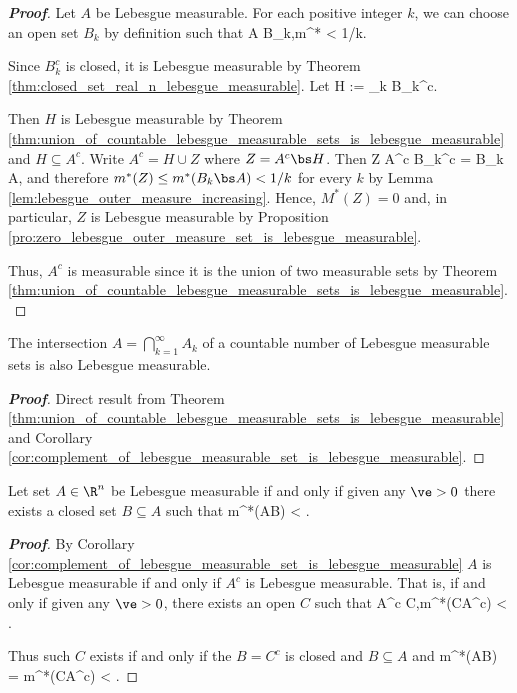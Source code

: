 \begin{proof}[\bf Proof]
Let $A$ be Lebesgue measurable. For each positive integer $k$, we can choose an open set $B_k$ by definition such that 
\be
A \subseteq B_k,\qquad m^* < 1/k.
\ee

Since $B_k^c$ is closed, it is Lebesgue measurable by Theorem \ref{thm:closed_set_real_n_lebesgue_measurable}. Let 
\be
H := \bigcup_k B_k^c.
\ee

Then $H$ is Lebesgue measurable by Theorem \ref{thm:union_of_countable_lebesgue_measurable_sets_is_lebesgue_measurable} and $H \subseteq A^c$. Write $A^c = H \cup Z$ where $Z = A^c\bs H$. Then 
\be
Z \subseteq A^c \bs B_k^c = B_k \bs A, 
\ee
and therefore $m^*(Z) \leq m^*(B_k\bs A) <  1/k$ for every $k$ by Lemma \ref{lem:lebesgue_outer_measure_increasing}. Hence, $M^*(Z) = 0$ and, in particular, $Z$ is Lebesgue measurable by Proposition \ref{pro:zero_lebesgue_outer_measure_set_is_lebesgue_measurable}.

Thus, $A^c$ is measurable since it is the union of two measurable sets by Theorem \ref{thm:union_of_countable_lebesgue_measurable_sets_is_lebesgue_measurable}.
\end{proof}



\begin{corollary}\label{cor:countable_intersection_lebesgue_measurable_sets_is_lebesgue_measurable}
The intersection $A = \bigcap_{k=1}^\infty A_k$ of a countable number of Lebesgue measurable sets is also Lebesgue measurable.
\end{corollary}

\begin{proof}[\bf Proof]
Direct result from Theorem \ref{thm:union_of_countable_lebesgue_measurable_sets_is_lebesgue_measurable} and Corollary \ref{cor:complement_of_lebesgue_measurable_set_is_lebesgue_measurable}. 
\end{proof}


\begin{corollary}\label{cor:lebesgue_measurable_iff_contains_closed_set_and_difference_set_small}
Let set $A\in\R^n$ be Lebesgue measurable if and only if given any $\ve >0$ there exists a closed set $B\subseteq A$ such that 
\be
m^*(A\bs B) < \ve.
\ee
\end{corollary}

\begin{proof}[\bf Proof]
By Corollary \ref{cor:complement_of_lebesgue_measurable_set_is_lebesgue_measurable} $A$ is Lebesgue measurable if and only if $A^c$ is Lebesgue measurable. That is, if and only if given any $\ve>0$, there exists an open $C$ such that 
\be
A^c \subseteq C,\qquad m^*(C\bs A^c) < \ve.
\ee

Thus such $C$ exists if and only if the $B = C^c$ is closed and $B \subseteq A$ and
\be
m^*(A\bs B) = m^*(C\bs A^c) < \ve.
\ee
\end{proof}




